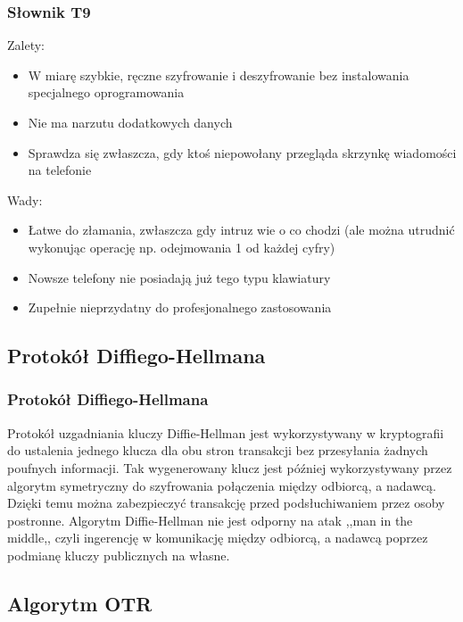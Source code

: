 \documentclass[xcolor=table]{beamer}
\begin{document}
\begin{frame}
  \frametitle{Słownik T9}
Zalety:
\begin{itemize}
\item W miarę szybkie, ręczne szyfrowanie i deszyfrowanie bez instalowania specjalnego oprogramowania
\item Nie ma narzutu dodatkowych danych
\item Sprawdza się zwłaszcza, gdy ktoś niepowołany przegląda skrzynkę wiadomości na telefonie
\end{itemize}

Wady:
\begin{itemize}
\item Łatwe do złamania, zwłaszcza gdy intruz wie o co chodzi (ale można utrudnić wykonując operację np. odejmowania 1 od każdej cyfry)
\item Nowsze telefony nie posiadają już tego typu klawiatury
\item Zupełnie nieprzydatny do profesjonalnego zastosowania
\end{itemize}

\end{frame}


\subsection{Protokół Diffiego-Hellmana}

\begin{frame}
  \frametitle{Protokół Diffiego-Hellmana}
	
Protokół uzgadniania kluczy Diffie-Hellman jest wykorzystywany w kryptografii
do ustalenia jednego klucza dla obu stron transakcji bez przesyłania żadnych 
poufnych informacji. Tak wygenerowany klucz jest później wykorzystywany przez
 algorytm symetryczny do szyfrowania połączenia między odbiorcą, a nadawcą. 
 Dzięki temu można zabezpieczyć transakcję przed podsłuchiwaniem przez osoby 
 postronne. Algorytm Diffie-Hellman nie jest odporny na atak 
 ,,man in the middle,, czyli ingerencję w komunikację między odbiorcą, 
 a nadawcą poprzez podmianę kluczy publicznych na własne.

\end{frame}


\subsection{Algorytm OTR}
\end{document}
